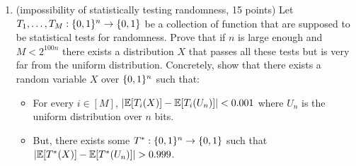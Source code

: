 \documentclass{article}
\begin{document}
\begin{enumerate}[noitemsep,topsep=\mdcompacttopsep]%

\item{}(impossibility of statistically testing randomness, 15 points) Let $T_1,\ldots,T_M:\{0,1\}^n\rightarrow\{0,1\}$ be a collection of function that are supposed to be statistical tests for randomness. Prove that if $n$ is large enough and  $M<2^{100n}$ there exists a distribution $X$ that passes all these tests but is very far from the uniform distribution. Concretely, show that
there exists a random variable $X$ over $\{0,1\}^n$ such that:

\begin{itemize}[noitemsep,topsep=\mdcompacttopsep]%

\item{}For every $i\in [M]$, $| \mathbb{E}[ T_i(X)]-\mathbb{E}[T_i(U_n)]|<0.001$ where $U_n$ is the uniform distribution over $n$ bits.%

\item{}But, there exists some $T^*:\{0,1\}^n\rightarrow\{0,1\}$ such that $| \E[ T^*(X)] - \E[T^*(U_n)] |>0.999$.


\end{itemize}
\end{enumerate}
\end{document}
